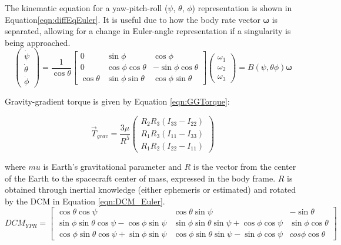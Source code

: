 \documentclass[]{aiaa-tc}%
\begin{document}
The kinematic equation for a yaw-pitch-roll ($\psi$, $\theta$, $\phi$) representation is shown in Equation\ref{eqn:diffEqEuler}\cite{SchaubJunkins}. It is useful due to how the body rate vector $\boldsymbol{\omega}$ is separated, allowing for a change in Euler-angle representation if a singularity is being approached.
	\begin{equation}		
		\begin{pmatrix}
		\dot{\psi}\\ 
		\dot{\theta}\\ 
		\dot{\phi}
		\end{pmatrix} = 
		\frac{1}{\cos \theta}\begin{bmatrix}
		0 & \sin\phi & \cos\phi \\ 
		0 & \cos\phi\cos\theta & -\sin\phi\cos\theta\\ 
		\cos \theta & \sin\phi\sin\theta & \cos\phi\sin\theta
		\end{bmatrix}
		\begin{pmatrix}
		\omega_1\\ 
		\omega_2\\ 
		\omega_3
		\end{pmatrix}=
		B(\psi,\theta\phi)\boldsymbol{\omega}
		\label{eqn:diffEqEuler}
	\end{equation}

Gravity-gradient torque is given by Equation \ref{eqn:GGTorque}\cite{SchaubJunkins}:

	\begin{equation}
		\vec{T}_{grav} = \frac{3\mu}{R^5}\begin{pmatrix}
		R_2R_3(I_{33}-I_{22})\\ 
		R_1R_3(I_{11}-I_{33})\\ 
		R_1R_2(I_{22}-I_{11})
		\end{pmatrix}
		\label{eqn:GGTorque}
	\end{equation}

\noindent where $mu$ is Earth's gravitational parameter and $R$ is the vector from the center of the Earth to the spacecraft center of mass, expressed in the body frame. $R$ is obtained through inertial knowledge (either ephemeris or estimated) and rotated by the DCM in Equation \ref{eqn:DCM_Euler}.
	\begin{equation}
		DCM_{YPR} = \begin{bmatrix}
		\cos\theta\cos\psi & \cos\theta\sin\psi & -\sin\theta\\ 
		\sin\phi\sin\theta\cos\psi -\cos\phi\sin\psi& \sin\phi\sin\theta\sin\psi+\cos\phi\cos\psi & \sin\phi\cos\theta\\ 
		\cos\phi\sin\theta\cos\psi+\sin\phi\sin\psi & \cos\phi\sin\theta\sin\psi-\sin\phi\cos\psi & cos\phi\cos\theta
		\end{bmatrix}
		\label{eqn:DCM_Euler}
	\end{equation}
\end{document}
